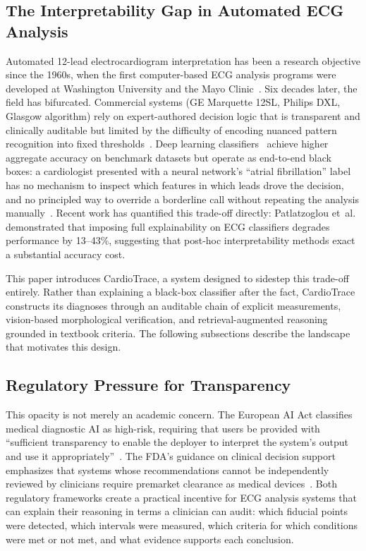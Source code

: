 \documentclass[journal,compsoc]{IEEEtran}
\newcommand{\system}{CardioTrace}
\begin{document}
\subsection{The Interpretability Gap in Automated ECG Analysis}

Automated 12-lead electrocardiogram interpretation has been a research objective since the 1960s, when the first computer-based ECG analysis programs were developed at Washington University and the Mayo Clinic~\cite{schlapfer2017computer}. Six decades later, the field has bifurcated. Commercial systems (GE Marquette 12SL, Philips DXL, Glasgow algorithm) rely on expert-authored decision logic that is transparent and clinically auditable but limited by the difficulty of encoding nuanced pattern recognition into fixed thresholds~\cite{schlapfer2017computer}. Deep learning classifiers~\cite{ribeiro2020automatic,hannun2019cardiologist,strodthoff2021deep} achieve higher aggregate accuracy on benchmark datasets but operate as end-to-end black boxes: a cardiologist presented with a neural network's ``atrial fibrillation'' label has no mechanism to inspect which features in which leads drove the decision, and no principled way to override a borderline call without repeating the analysis manually~\cite{rudin2019stop}. Recent work has quantified this trade-off directly: Patlatzoglou et~al.~\cite{explainability_cost_2025} demonstrated that imposing full explainability on ECG classifiers degrades performance by 13--43\%, suggesting that post-hoc interpretability methods exact a substantial accuracy cost.

This paper introduces \system{}, a system designed to sidestep this trade-off entirely. Rather than explaining a black-box classifier after the fact, \system{} constructs its diagnoses through an auditable chain of explicit measurements, vision-based morphological verification, and retrieval-augmented reasoning grounded in textbook criteria. The following subsections describe the landscape that motivates this design.

\subsection{Regulatory Pressure for Transparency}

This opacity is not merely an academic concern. The European AI Act classifies medical diagnostic AI as high-risk, requiring that users be provided with ``sufficient transparency to enable the deployer to interpret the system's output and use it appropriately''~\cite{eu_ai_act_2024}. The FDA's guidance on clinical decision support emphasizes that systems whose recommendations cannot be independently reviewed by clinicians require premarket clearance as medical devices~\cite{eu_ai_act_implications_2024}. Both regulatory frameworks create a practical incentive for ECG analysis systems that can explain their reasoning in terms a clinician can audit: which fiducial points were detected, which intervals were measured, which criteria for which conditions were met or not met, and what evidence supports each conclusion.
\end{document}
